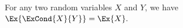     \begin{lemma}%
        For any two random variables
        $X$ and $Y$, we have
        \begin{math}
            \Ex{ \bigl. \ExCond{X}{ Y} } = \Ex{ \bigl. X}.
        \end{math}
    \end{lemma}
